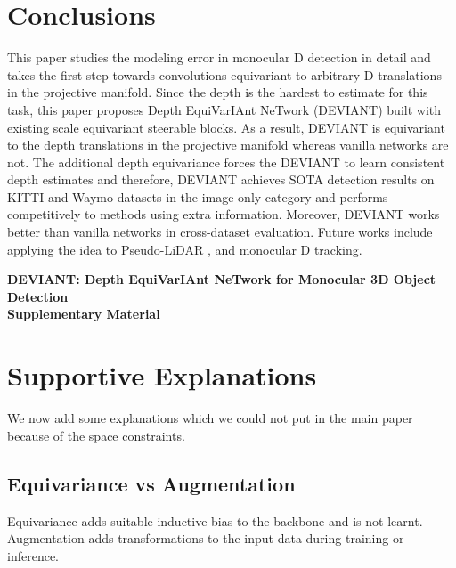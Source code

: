 \documentclass[runningheads]{llncs}
\newcommand{\threeD}{D}
\newcommand{\lidar}{LiDAR}
\newcommand{\equivariant} {equivariant}
\newcommand{\equivariance}{equivariance}
\newcommand{\Equivariance}{Equivariance}
\newcommand{\scaleEquivariant} {scale \equivariant}
\newcommand{\depthEquivariance} {depth \equivariance}
\newcommand{\manifold}{manifold}
\newcommand{\kitti}{KITTI}
\newcommand{\waymo}{Waymo}
\newcommand{\imageOnly}{image-only}
\newcommand{\sota}{SOTA}
\newcommand{\pseudoLidar}{Pseudo-{\lidar}}
\newcommand{\methodName}{DEVIANT}
\newcommand{\methodNameFull}{Depth EquiVarIAnt NeTwork}
\newcommand{\paperTitle}{\methodName: \methodNameFull{} for Monocular 3D Object Detection}
\begin{document}
\section{Conclusions}
    This paper studies the modeling error in monocular \threeD{} detection in detail and takes the first step towards convolutions equivariant to arbitrary \threeD{} translations in the projective manifold.
    Since the depth is the hardest to estimate for this task, this
    paper proposes \methodNameFull{} (\methodName) built with existing \scaleEquivariant{} steerable blocks. 
    As a result, \methodName{} is \equivariant{} to the depth translations in the projective \manifold{} whereas vanilla networks are not.
    The additional \depthEquivariance{} forces the \methodName{} to learn consistent depth estimates and therefore, \methodName{} achieves \sota{} detection results on \kitti{} and \waymo{} datasets in the \imageOnly{} category and performs competitively to methods using extra information.
    Moreover, \methodName{} works better than vanilla networks in cross-dataset evaluation.
    Future works include applying the idea to \pseudoLidar{} \cite{wang2019pseudo}, and monocular \threeD{} tracking. 

\clearpage





\clearpage

\appendix 

\renewcommand{\thesection}{A\arabic{section}}


\begin{center}
\textbf{\Large \paperTitle\\ Supplementary Material\\}
\end{center}



\section{Supportive Explanations}\label{sec:supplementary_explanation}
    
    We now add some explanations which we could not put in the main paper because of the space constraints.
    
\subsection{\Equivariance{} vs Augmentation} 
        \Equivariance{} adds suitable inductive bias to the backbone \cite{cohen2016group, dieleman2016exploiting} and is not learnt.
        Augmentation adds transformations to the input data during training or inference.
        
\end{document}
